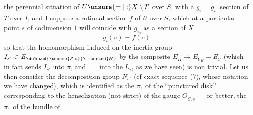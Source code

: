 the perennial situation of $U\unsure{=|:}X\setminus T$ over $S$, with a $g_i=g_{i_0}$ section of $T$ over $I$, and I suppose  a rational section $f$ of $U$ over $S$, which at a particular point $s$ of  codimension $1$ will coincide with $g_{i_0}$ as a section of $X$
\[
g_i(s)=f(s)
\]
so that the homomorphism induced on the inertia group $I_{s'}\subset E_{\deleted{\unsure{S|s}}\inserted{K}}$ by the composite $E_K\longrightarrow E_{U_K}-E_U$ (which in fact sends $I_{s'}$ into $\pi$, and $=$ into the $L_i$, as we have seen) is non  trivial. Let us then consider the decomposition group $N_{s'}$ (cf exact sequence (7), whose notation we have changed), which is identified as the $\pi_1$ of the ``punctured disk'' corresponding to the henselization (not strict) of the gauge $\underline O_{S,s}$ --- or better, the $\pi_1$ of the bundle of
